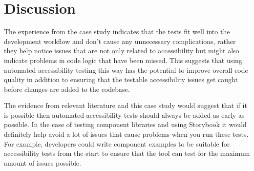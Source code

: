 \documentclass{master_thesis}
\begin{document}
\section{Discussion} \label{chap:conclusions}

The experience from the case study indicates that the tests fit well into the development workflow and don't cause any unnecessary complications, rather they help notice issues that are not only related to accessibility but might also indicate problems in code logic that have been missed. This suggests that using automated accessibility testing this way has the potential to improve overall code quality in addition to ensuring that the testable accessibility issues get caught before changes are added to the codebase.

The evidence from relevant literature and this case study would suggest that if it is possible then automated accessibility tests should always be added as early as possible. In the case of testing component libraries and using Storybook it would definitely help avoid a lot of issues that cause problems when you run these tests. For example, developers could write component examples to be suitable for accessibility tests from the start to ensure that the tool can test for the maximum amount of issues possible.




\end{document}
